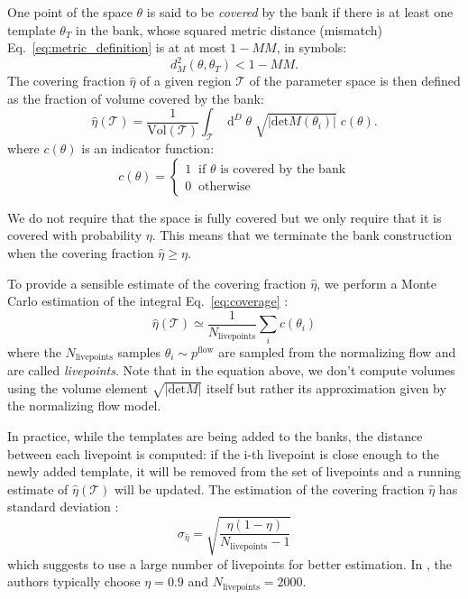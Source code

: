 \documentclass[twocolumn,showpacs,preprintnumbers,nofootinbib,prd,
superscriptaddress,10pt]{revtex4-2}
\newcommand{\dvol}[2]{\ensuremath{\operatorname{d}^{#2}\!{#1}}}
\begin{document}
One point of the space $\theta$ is said to be {\it covered} by the bank if there is at least one template $\theta_T$ in the bank, whose squared metric distance (mismatch) Eq.~\eqref{eq:metric_definition} is at at most $1 - MM$, in symbols:
\begin{equation}
	d^2_M(\theta, \theta_T)<1 - MM.
\end{equation}
%
The covering fraction $\hat{\eta}$ of a given region $\mathcal{T}$ of the parameter space is then defined as the fraction of volume covered by the bank:
\begin{equation}\label{eq:coverage}
	\hat{\eta}(\mathcal{T}) = \frac{1}{\text{Vol}(\mathcal{T})} \int_\mathcal{T} \dvol{\theta}{D} \; \sqrt{|\text{det}M(\theta_i)|} \; c(\theta).
\end{equation}
where $c(\theta)$ is an indicator function:
\begin{equation}
	c(\theta) = \left\{
                \begin{array}{ll}
                  1 \;\; \text{if $\theta$ is covered by the bank}\\
                  0 \;\; \text{otherwise}
                \end{array}
              \right.
\end{equation}

We do not require that the space is fully covered but we only require that it is covered with probability $\eta$. This means that we terminate the bank construction when the covering fraction $\hat{\eta} \geq \eta$.

To provide a sensible estimate of the covering fraction $\hat{\eta}$, we perform a Monte Carlo estimation of the integral Eq.~\eqref{eq:coverage} \cite{Coogan:2022qxs}:
\begin{equation}\label{eq:coverage_estimate}
	\hat{\eta}(\mathcal{T}) \simeq \frac{1}{N_\text{livepoints}} \sum_i c(\theta_i)
\end{equation}
%
where the $N_\text{livepoints}$ samples $\theta_i \sim p^\text{flow}$ are sampled from the normalizing flow and are called {\it livepoints}.
Note that in the equation above, we don't compute volumes using the volume element $\sqrt{|\text{det}M|}$ itself but rather its approximation given by the normalizing flow model.

In practice, while the templates are being added to the banks, the distance between each livepoint is computed: if the i-th livepoint is close enough to the newly added template, it will be removed from the set of livepoints and a running estimate of $\hat{\eta}(\mathcal{T})$ will be updated.
The estimation of the covering fraction $\hat{\eta}$ has standard deviation \cite[App. A]{Coogan:2022qxs}:
\begin{equation}\label{eq:variance_coverage}
	\sigma_{\hat{\eta}} = \sqrt{\frac{\eta(1-\eta)}{N_\text{livepoints}-1}}
\end{equation}
which suggests to use a large number of livepoints for better estimation.
In \cite{Coogan:2022qxs}, the authors typically choose $\eta = 0.9$ and $N_\text{livepoints} = 2000$.
\end{document}

